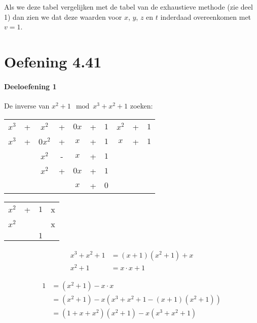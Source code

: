 \documentclass[12pt]{article}
\begin{document}
Als we deze tabel vergelijken met de tabel van de exhaustieve methode (zie deel 1) dan zien we dat deze waarden voor $x$, $y$, $z$ en $t$ inderdaad overeenkomen met $v=1$.

\newpage

\section{Oefening 4.41}
\paragraph{Deeloefening 1}
	
	\par De inverse van $x^{2}+1 \mod x^{3}+x^{2}+1$ zoeken:

	\begin{table}[H]
	\centering
	\begin{tabular}{ccccccc|ccc}
		$x^{3}$&+&$x^{2}$&+&$0x$&+&$1$&$x^{2}$&+&$1$ \\
		\cline{8-10}
		$x^{3}$&+&$0x^{2}$&+&$x$&+&$1$&$x$&+&$1$ \\
		\cline{1-7}
		 & &$x^{2}$&-&$x$&+&$1$& & & \\
		 & &$x^{2}$&+&$0x$&+&$1$& & & \\
		\cline{3-7}
		 & & & &$x$&+&$0$& & & \\ 

	\end{tabular}
	\end{table}

	\begin{table}[H]
	\centering
	\begin{tabular}{ccc|c}
		$x^{2}$&+&$1$&x \\
		\cline{4-4}
		$x^{2}$& & &x \\
		\cline{1-3}
		 & &$1$& \\
	\end{tabular}
	\end{table}

	\begin{align}
		x^{3}+x^{2}+1 &= (x+1)(x^{2}+1)+x \\
		x^{2}+1 &= x\cdot x+1
	\end{align}

	\begin{align}
		1 &= (x^{2}+1)-x\cdot x \\
		&= (x^{2}+1)-x(x^{3}+x^{2}+1-(x+1)(x^{2}+1))\\
		&= (1+x+x^{2})(x^{2}+1)-x(x^{3}+x^{2}+1)\\
	\end{align}
	
\end{document}
